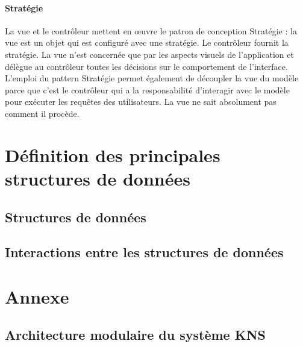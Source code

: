 \documentclass[10pt,a4paper]{report}
\begin{document}
		\paragraph{Stratégie}
		\begin{flushleft}
		La vue et le contrôleur mettent en œuvre le patron de conception Stratégie : la vue est un objet qui est configuré avec une stratégie. Le contrôleur fournit la stratégie. La vue n’est concernée que par les aspects visuels de l’application et délègue au contrôleur toutes les décisions sur le  comportement de l’interface. L’emploi du pattern Stratégie permet également de découpler la vue du modèle parce que c’est le contrôleur qui a la responsabilité d’interagir avec le modèle pour exécuter les requêtes des utilisateurs. La vue ne sait absolument pas comment il procède.		
		\end{flushleft}



\section{Définition des principales structures de données}

	\subsection{Structures de données}

	\subsection{Interactions entre les structures de données} %

\newpage
\section{Annexe}

\subsection{Architecture modulaire du système KNS}
	\begin{center}
	\end{center}
\end{document}
